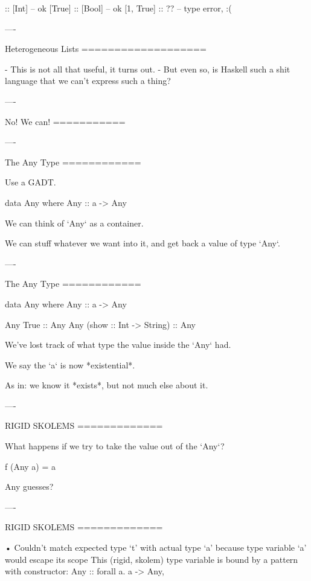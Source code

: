 \begin{hs}
  [1, 2, 3] :: [Int]   -- ok
  [True]    :: [Bool]  -- ok
  [1, True] :: ??      -- type error, :(
\end{hs}

----

Heterogeneous Lists
===================

- This is not all that useful, it turns out.
- But even so, is Haskell such a shit language that we can't express such a thing?

----

No! We can!
===========

----

The Any Type
============

Use a GADT.

\begin{hs}
  data Any where
    Any :: a -> Any
\end{hs}

We can think of `Any` as a container.

We can stuff whatever we want into it, and get back a value of type `Any`.

----

The Any Type
============

\begin{hs}
  data Any where
    Any :: a -> Any

  Any True                    :: Any
  Any (show :: Int -> String) :: Any
\end{hs}


We've lost track of what type the value inside the `Any` had.

We say the `a` is now *existential*.

As in: we know it *exists*, but not much else about it.

----

RIGID SKOLEMS
=============

What happens if we try to take the value out of the `Any`?

\begin{hs}
  f (Any a) = a
\end{hs}

Any guesses?

----

RIGID SKOLEMS
=============

\begin{raw}
  • Couldn't match expected type ‘t’ with actual type ‘a’
    because type variable ‘a’ would escape its scope
    This (rigid, skolem) type variable is bound by
      a pattern with constructor: Any :: forall a. a -> Any,
\end{raw}

